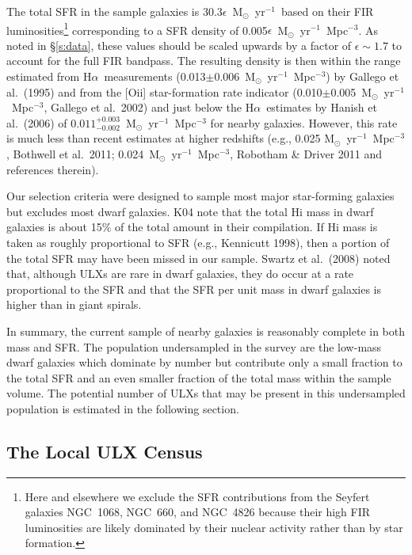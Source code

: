 \documentclass{article}
\newcommand{\msfr}{M$_{\odot}$~yr$^{-1}$}
\newcommand{\ha}{H$\alpha$}
\newcommand{\etal}{et al.}
\begin{document}
The total SFR in the sample galaxies is 30.3$\epsilon$~\msfr\ based on their FIR 
luminosities\footnote{Here and elsewhere we exclude the SFR contributions from the Seyfert galaxies NGC~1068,
 NGC~660, and NGC~4826 because their high FIR luminosities are likely dominated by their 
 nuclear activity rather than by star formation.} 
 corresponding to a SFR density of 0.005$\epsilon$~\msfr~Mpc$^{-3}$.
As noted in \S \ref{s:data}, these values should be scaled upwards by a factor of $\epsilon \sim1.7$ to 
 account for the full FIR bandpass. %
The resulting density is then within the  range estimated 
from \ha\  measurements (0.013$\pm$0.006~\msfr~Mpc$^{-3}$) by Gallego \etal\ (1995) 
 and from the  [O{\sc ii}] star-formation rate 
 indicator (0.010$\pm$0.005~\msfr~Mpc$^{-3}$, Gallego \etal\ 2002)
 and just below the \ha\ estimates by Hanish \etal\ (2006) of
 $0.011^{+0.003}_{-0.002}$~\msfr~Mpc$^{-3}$ for nearby galaxies.
However, this rate is much less than recent estimates at higher redshifts
 (e.g., 0.025 \msfr~Mpc$^{-3}$, Bothwell \etal\ 2011; %
 0.024~\msfr~Mpc$^{-3}$, Robotham \& Driver 2011 and references therein). %

Our selection criteria were designed to sample most major star-forming galaxies but 
excludes most dwarf galaxies. 
K04 note that the total H{\sc i} mass in
dwarf galaxies is about 15\% of the total amount in their compilation.
If H{\sc i} mass is taken as roughly proportional to SFR (e.g., Kennicutt 1998), 
 then a portion of the total SFR may have been missed in our sample.
Swartz \etal\ (2008) noted that, although ULXs are rare in dwarf galaxies, they do occur at 
a rate proportional to the SFR and that the SFR per unit mass in dwarf galaxies is higher 
than in giant spirals. 

In summary, the current sample of nearby galaxies is reasonably complete
 in both mass and SFR. 
The population undersampled in the survey are the low-mass dwarf galaxies which
 dominate by number but contribute only a small fraction to the total SFR and an even
 smaller fraction of the total mass within the sample volume.
The potential number of ULXs that may be present in this undersampled population
 is estimated in the following section.

\subsection{The Local ULX Census}
\end{document}
